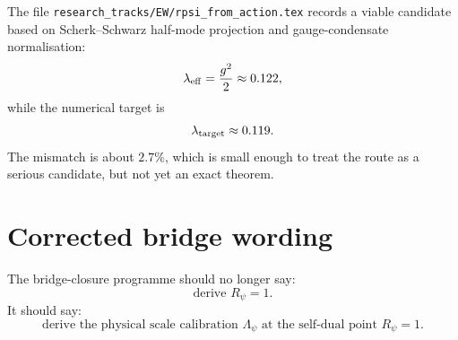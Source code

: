 \documentclass[12pt,a4paper]{article}
\begin{document}
The file \texttt{research\_tracks/EW/rpsi\_from\_action.tex} records a viable
candidate based on Scherk--Schwarz half-mode projection and gauge-condensate
normalisation:
\[
  \lambda_{\rm eff}=\frac{g^2}{2}\approx0.122,
\]
while the numerical target is
\[
  \lambda_{\rm target}\approx0.119.
\]
The mismatch is about $2.7\%$, which is small enough to treat the route as a
serious candidate, but not yet an exact theorem.

\section{Corrected bridge wording}

The bridge-closure programme should no longer say:
\[
  \text{derive } R_\psi=1.
\]
It should say:
\[
  \text{derive the physical scale calibration }\Lambda_\psi
  \text{ at the self-dual point }R_\psi=1.
\]
\end{document}
